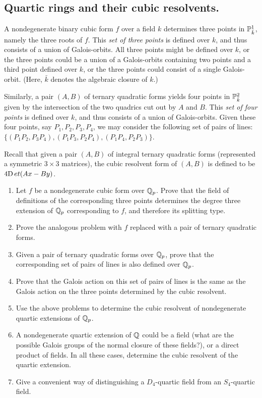 \documentclass[12pt,amsfont]{amsart}
\begin{document}
\subsection{{\bf Quartic rings and their cubic resolvents.}}  A nondegenerate
  binary cubic form $f$ over a field $k$ determines three points in
  $\mathbb{P}^1_{\bar{k}}$, namely the three roots of $f$. This {\it set of
    three points} is defined over $k$, and thus consists of a union of
  Galois-orbits. All three points might be defined over $k$, or the
  three points could be a union of a Galois-orbits containing two
  points and a third point defined over $k$, or the three points could
  consist of a single Galois-orbit.  (Here, $\bar{k}$ denotes the
  algebraic closure of $k$.)


Similarly, a pair $(A,B)$ of ternary quadratic forms yields four
points in $\mathbb{P}^2_{\bar{k}}$ given by the intersection of the two
quadrics cut out by $A$ and $B$. This {\it set of four points} is
defined over $k$, and thus consists of a union of Galois-orbits.
Given these four points, say $P_1,P_2,P_3,P_4$, we may consider the
following set of pairs of lines:
$\{(P_1P_2,P_3P_4),(P_1P_3,P_2P_4),(P_1P_4,P_2P_3)\}$.

Recall that given a pair $(A,B)$ of integral ternary quadratic forms
(represented a symmetric $3\times 3$ matrices), the cubic resolvent
form of $(A,B)$ is defined to be $4{ {\operatorname Det}}(Ax-By)$.

\begin{enumerate}
\item Let $f$ be a nondegenerate cubic form over ${\mathbb Q}_p$. Prove that
  the field of definitions of the corresponding three points
  determines the degree three extension of ${\mathbb Q}_p$ corresponding to
  $f$, and therefore its splitting type.
\item Prove the analogous problem with $f$ replaced with a pair of
  ternary quadratic forms.
\item Given a pair of ternary quadratic forms over ${\mathbb Q}_p$, prove that
  the corresponding set of pairs of lines is also defined over ${\mathbb Q}_p$.
\item Prove that the Galois action on this set of pairs of lines is
  the same as the Galois action on the three points determined by the
  cubic resolvent.
\item Use the above problems to determine the cubic resolvent of
  nondegenerate quartic extensions of ${\mathbb Q}_p$.
\item A nondegenerate quartic extension of ${\mathbb Q}$ could be a field (what
  are the possible Galois groups of the normal closure of these
  fields?), or a direct product of fields. In all these cases,
  determine the cubic resolvent of the quartic extension.
\item Give a convenient way of distinguishing a $D_4$-quartic field
  from an $S_4$-quartic field.

\end{enumerate}
\end{document}
